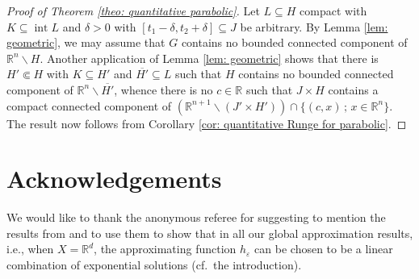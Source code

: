 \documentclass[12pt]{amsart}
\newcommand{\R}{\mathbb{R}}
\theoremstyle{definition}
\theoremstyle{remark}
\numberwithin{equation}{section}
\begin{document}
\begin{proof}[Proof of Theorem \ref{theo: quantitative parabolic}] Let $L \subseteq H$ compact with $K \subseteq \operatorname{int} L$ and $\delta > 0$ with $[t_1-\delta,t_2+\delta]\subseteq J$ be arbitrary. 
	By Lemma \ref{lem: geometric}, we may assume that $G$ contains  no bounded connected component of $\R^n\backslash H$. Another application of Lemma \ref{lem: geometric} shows that there is $H' \Subset H$ with $K \subseteq H'$ and $\overline{H'} \subseteq L$ such that $H$ contains no bounded connected component of $\R^n\backslash \overline{H'}$, whence there is  no $c\in\R$ such that $J \times H$ contains a compact connected component of $\left(\R^{n+1}\backslash(J'\times H')\right)\cap\{(c, x) \,; \, x \in\R^{n}\}$. The result now follows from Corollary \ref{cor: quantitative Runge for parabolic}.
\end{proof}

\section*{Acknowledgements} We would like to thank the anonymous referee for suggesting to mention the results from \cite[Section 10.5]{HoermanderPDO2} and to use them to show that in all our global approximation results, i.e., when $X=\R^d$, the approximating function $h_\varepsilon$ can be chosen to be a linear combination of exponential solutions (cf.\ the introduction).
\end{document}
